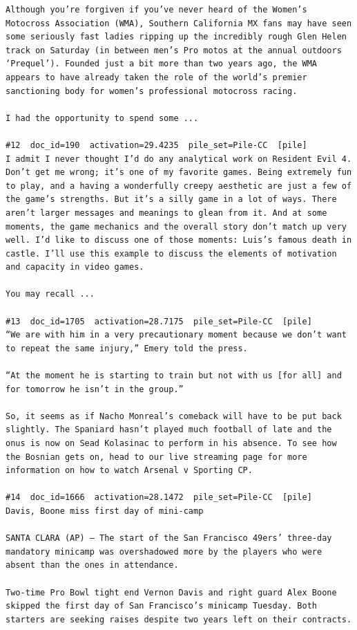 \begin{verbatim}
Although you’re forgiven if you’ve never heard of the Women’s Motocross Association (WMA), Southern California MX fans may have seen some seriously fast ladies ripping up the incredibly rough Glen Helen track on Saturday (in between men’s Pro motos at the annual outdoors ‘Prequel’). Founded just a bit more than two years ago, the WMA appears to have already taken the role of the world’s premier sanctioning body for women’s professional motocross racing.

I had the opportunity to spend some ...

#12  doc_id=190  activation=29.4235  pile_set=Pile-CC  [pile]
I admit I never thought I’d do any analytical work on Resident Evil 4. Don’t get me wrong; it’s one of my favorite games. Being extremely fun to play, and a having a wonderfully creepy aesthetic are just a few of the game’s strengths. But it’s a silly game in a lot of ways. There aren’t larger messages and meanings to glean from it. And at some moments, the game mechanics and the overall story don’t match up very well. I’d like to discuss one of those moments: Luis’s famous death in castle. I’ll use this example to discuss the elements of motivation and capacity in video games.

You may recall ...

#13  doc_id=1705  activation=28.7175  pile_set=Pile-CC  [pile]
“We are with him in a very precautionary moment because we don’t want to repeat the same injury,” Emery told the press.

“At the moment he is starting to train but not with us [for all] and for tomorrow he isn’t in the group.”

So, it seems as if Nacho Monreal’s comeback will have to be put back slightly. The Spaniard hasn’t played much football of late and the onus is now on Sead Kolasinac to perform in his absence. To see how the Bosnian gets on, head to our live streaming page for more information on how to watch Arsenal v Sporting CP.

#14  doc_id=1666  activation=28.1472  pile_set=Pile-CC  [pile]
Davis, Boone miss first day of mini-camp

SANTA CLARA (AP) — The start of the San Francisco 49ers’ three-day mandatory minicamp was overshadowed more by the players who were absent than the ones in attendance.

Two-time Pro Bowl tight end Vernon Davis and right guard Alex Boone skipped the first day of San Francisco’s minicamp Tuesday. Both starters are seeking raises despite two years left on their contracts.


\end{verbatim}
